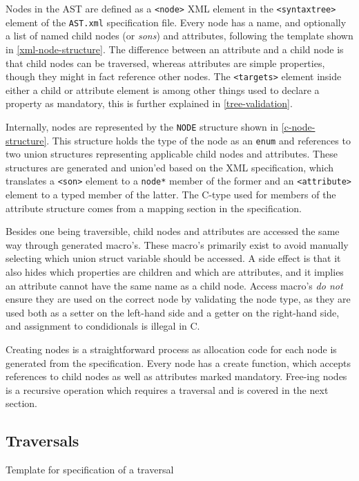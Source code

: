 \documentclass[twoside,openright]{uva-bachelor-thesis}
\newcommand{\code}[1]{\texttt{\footnotesize#1}}
\begin{document}
			Nodes in the AST are defined as a \code{<node>} XML element in the \code{<syntaxtree>} element of the \code{AST.xml} specification file. Every node has a name, and optionally a list of named child nodes (or \emph{sons}) and attributes, following the template shown in \cref{xml-node-structure}. The difference between an attribute and a child node is that child nodes can be traversed, whereas attributes are simple properties, though they might in fact reference other nodes. The \code{<targets>} element inside either a child or attribute element is among other things used to declare a property as mandatory, this is further explained in \cref{tree-validation}.
			
			Internally, nodes are represented by the \code{NODE} structure shown in \cref{c-node-structure}. This structure holds the type of the node as an \code{enum} and references to two union structures representing applicable child nodes and attributes. These structures are generated and union'ed based on the XML specification, which translates a \code{<son>} element to a \code{node*} member of the former and an \code{<attribute>} element to a typed member of the latter. The C-type used for members of the attribute structure comes from a mapping section in the specification.
			
			Besides one being traversible, child nodes and attributes are accessed the same way through generated macro's. These macro's primarily exist to avoid manually selecting which union struct variable should be accessed. A side effect is that it also hides which properties are children and which are attributes, and it implies an attribute cannot have the same name as a child node. Access macro's \emph{do not} ensure they are used on the correct node by validating the node type, as they are used both as a setter on the left-hand side and a getter on the right-hand side, and assignment to condidionals is illegal in C.
			
			Creating nodes is a straightforward process as allocation code for each node is generated from the specification. Every node has a create function, which accepts references to child nodes as well as attributes marked mandatory. Free-ing nodes is a recursive operation which requires a traversal and is covered in the next section.
			
		\subsection{Traversals}
		\label{c-trav}
			\begin{codebox}[label=xml-trav-structure]{Template for specification of a traversal}
			\end{codebox}
									
\end{document}
